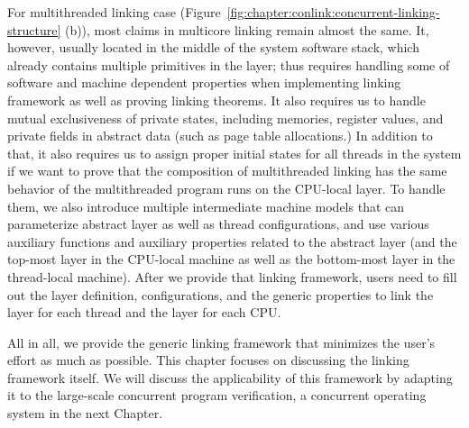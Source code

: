 For multithreaded linking case (Figure~\ref{fig:chapter:conlink:concurrent-linking-structure} (b)), most claims in multicore linking remain almost the same. 
It, however, usually located in the middle of the system software stack, which already contains multiple primitives in the layer; thus requires handling some of software and machine dependent properties when implementing linking framework as well as proving linking theorems. 
It also requires us to handle mutual exclusiveness of 
private states, including memories, register values, and private fields in abstract data (such as page table allocations.)
In addition to that, it also requires us to assign proper initial states for all threads in the system if we want to prove that the composition of multithreaded linking has the same behavior of the multithreaded program runs on the CPU-local layer. 
To handle them, we also introduce multiple intermediate machine models that can parameterize abstract layer as well as thread configurations, and use various auxiliary functions and auxiliary properties related to the abstract layer (and the top-most layer in the CPU-local machine as well as the bottom-most layer in the thread-local machine). 
After we provide that linking framework, users need to 
fill out the layer definition, configurations, and the generic properties to link the layer for each thread and the layer for each CPU.

All in all, we provide the generic linking framework that minimizes the user's effort as much as possible.
This chapter focuses on discussing the linking framework itself.
We will discuss the applicability of this framework by adapting it to the large-scale concurrent program verification, a concurrent operating system in the next Chapter.








